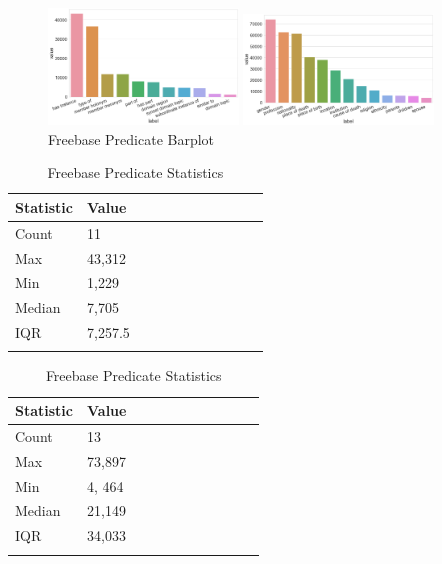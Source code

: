 
\begin{figure}[H]
	\parbox{.5\linewidth}{
   		\centering
    		\includegraphics[width=0.45\textwidth, height=0.2\textheight]{Wordnet_Predicate_Counts}
		\caption{Wordnet Predicate Barplot}
		}
	\hfill
	\parbox{.5\linewidth}{
   		\centering
		\includegraphics[width=0.45\textwidth, height=0.2\textheight]{Freebase_Predicate_Counts}
		\caption{Freebase Predicate Barplot}
		}
\end{figure}

\begin{table}[H]
	\parbox{.5\linewidth}{
		\centering
		\begin{tabular}{lllllllllll}
  			\textbf{Statistic} & \textbf{Value}  \\
  			\hline
			Count & 11 \\
			Max & 43,312  \\
			Min & 1,229  \\
  			Median & 7,705  \\
  			IQR & 7,257.5  \\
				&
		\end{tabular}
		\caption{Wordnet Predicate Statistics}
		}
	\hfill
	\parbox{.5\linewidth}{
		\centering
		\begin{tabular}{lllllllllll}
  			\textbf{Statistic} & \textbf{Value}  \\
  			\hline
			Count & 13 \\
			Max & 73,897  \\
			Min & 4, 464  \\
  			Median & 21,149  \\
  			IQR & 34,033  \\
				&
		\end{tabular} 
		\caption{Freebase Predicate Statistics}
		}
\end{table}

